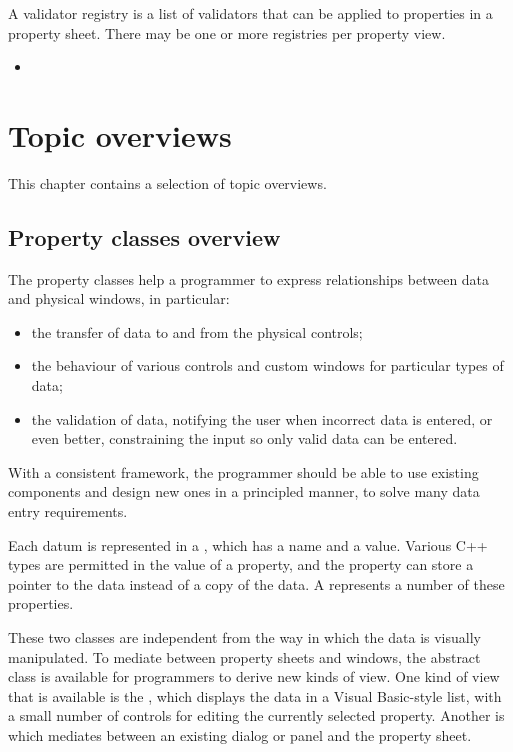 A validator registry is a list of validators that can be applied to properties in a property sheet.
There may be one or more registries per property view.

\begin{itemize}\itemsep=0pt
\item {}
\end{itemize}


\chapter{Topic overviews}\label{overviews}

This chapter contains a selection of topic overviews.

\section{Property classes overview}\label{propertyoverview}

The property classes help a programmer to express relationships between
data and physical windows, in particular:

\begin{itemize}\itemsep=0pt
\item the transfer of data to and from the physical controls;
\item the behaviour of various controls and custom windows for particular
types of data;
\item the validation of data, notifying the user when incorrect data is entered,
or even better, constraining the input so only valid data can be entered.
\end{itemize}

With a consistent framework, the programmer should be able to use existing
components and design new ones in a principled manner, to solve many data entry
requirements.

Each datum is represented in a , which has a name and a value.
Various C++ types are permitted in the value of a property, and the property can store a pointer
to the data instead of a copy of the data. A  represents a number of these properties.

These two classes are independent from the way in which the data is visually manipulated. To
mediate between property sheets and windows, the abstract class  is
available for programmers to derive new kinds of view. One kind of view that is available is the ,
which displays the data in a Visual Basic-style list, with a small number of controls for editing
the currently selected property. Another is  which
mediates between an existing dialog or panel and the property sheet.

